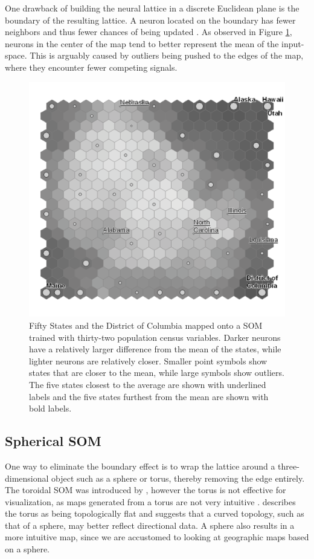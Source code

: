 \documentclass[10pt,titlepage]{article}
\begin{document}
One drawback of building the neural lattice in a discrete Euclidean plane is the
boundary of the resulting lattice.  A neuron located on the boundary has fewer
neighbors and thus fewer chances of being updated \citep{wu2006}.  As observed
in Figure \ref{figure1}, neurons in the center of the map tend to better
represent the mean of the input-space.  This is arguably caused by outliers
being pushed to the edges of the map, where they encounter fewer competing
signals.

\begin{figure}
\centering
\includegraphics[width=\linewidth]{gridedge_grey.pdf}
\caption{Fifty States and the District of Columbia mapped onto a
SOM trained with thirty-two population census variables.  Darker neurons have a
relatively larger difference from the mean of the states, while lighter
neurons are relatively closer.  Smaller point symbols show states that are closer to the
mean, while large symbols show outliers. The five states closest to the average are shown
with underlined labels and the five states furthest from the mean are shown with
bold labels.}
\label{figure1}
\end{figure}

\subsection{Spherical SOM}
One way to eliminate the boundary effect is to wrap the lattice around a
three-dimensional object such as a sphere or torus, thereby removing the edge
entirely. The toroidal SOM was introduced by \cite{li1993}, however the torus is
not effective for visualization, as maps generated from a torus are not
very intuitive \citep{ito2000,wu2006}.  \cite{ritter99} describes the torus as
being topologically flat and suggests that a curved topology, such as that of a
sphere, may better reflect directional data.  A sphere also results in a more
intuitive map, since we are accustomed to looking at geographic maps based on a sphere.
\end{document}
